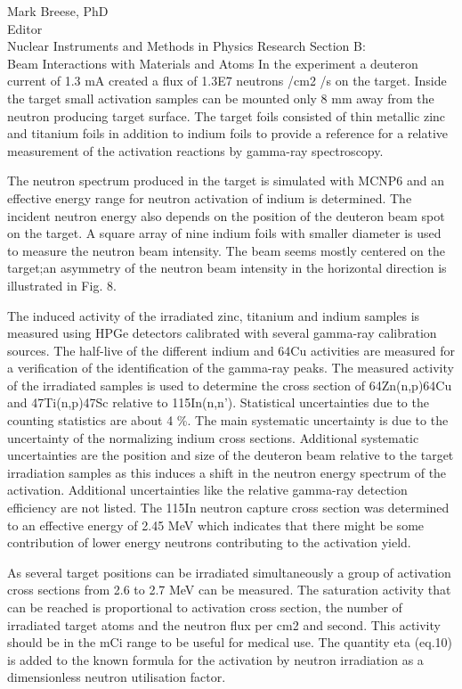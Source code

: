 \documentclass{letter} %
\begin{document}
\begin{letter}{Mark Breese, PhD \\
Editor \\
Nuclear Instruments and Methods in Physics Research Section B: \\
Beam Interactions with Materials and Atoms}
In the experiment a deuteron current of 1.3 mA created a flux of 1.3E7 neutrons /cm2 /s on the target. Inside the target small activation samples can be mounted only 8 mm away from the neutron producing target surface. The target foils consisted of thin metallic zinc and titanium foils in
addition to indium foils to provide a reference for a relative measurement of the activation reactions by gamma-ray spectroscopy.

The neutron spectrum produced in the target is simulated with MCNP6 and an effective energy range for neutron activation of indium is determined.
The incident neutron energy also depends on the position of the deuteron beam spot on the target. A square array of nine indium foils  with smaller diameter is used to measure the neutron beam intensity. The beam seems mostly centered on the target;an asymmetry of the neutron beam intensity in the horizontal direction is illustrated in Fig. 8.

The induced activity of the irradiated zinc, titanium and indium samples is measured using HPGe detectors calibrated with several gamma-ray calibration sources. The half-live of the different indium and 64Cu activities are measured for a verification of the identification of the gamma-ray peaks.
The measured activity of the irradiated samples is used to determine the  cross section of 64Zn(n,p)64Cu and 47Ti(n,p)47Sc relative to 115In(n,n'). Statistical uncertainties due to the counting statistics are about 4 \%. The main systematic uncertainty is due to the uncertainty of the normalizing indium cross sections. Additional systematic uncertainties are the position
and size of the deuteron beam relative to the target irradiation samples as this induces a shift in the neutron energy spectrum of the activation. Additional uncertainties like the relative gamma-ray detection efficiency are not listed. The 115In neutron capture cross section was determined to
an effective energy of 2.45 MeV which indicates that there might be some contribution of lower energy neutrons contributing to the activation yield.

As several target positions can be irradiated simultaneously a group of activation cross sections from 2.6 to 2.7 MeV can be measured. The saturation activity that can be reached is proportional to activation cross section, the number of irradiated target atoms and the neutron flux per cm2 and second. This activity should be in the mCi range to be useful for
medical use. The quantity eta (eq.10) is added to the known formula for the activation by neutron irradiation as a dimensionless neutron utilisation factor.


\end{letter}
\end{document}
